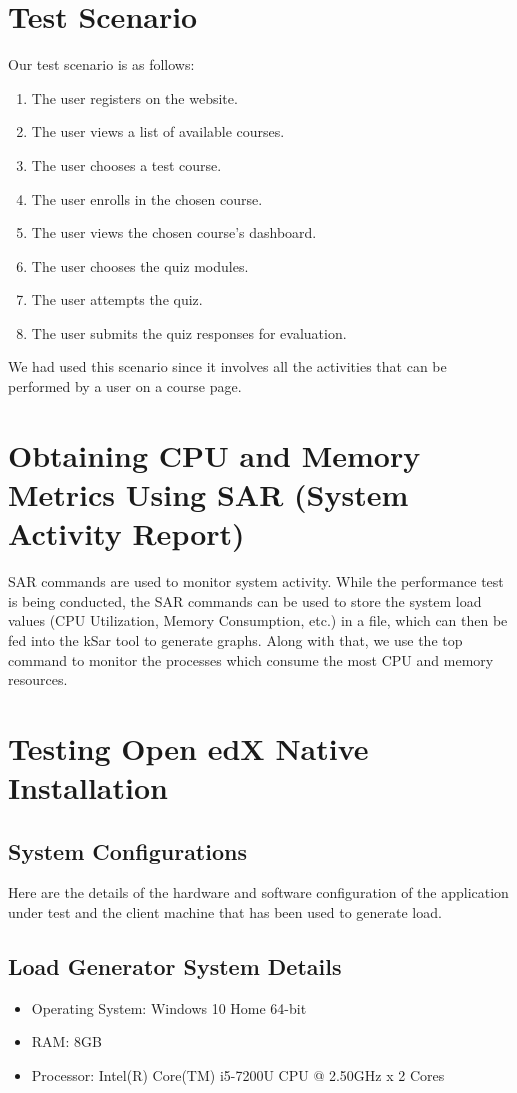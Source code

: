\documentclass[12pt]{report}
\begin{document}
\section{Test Scenario}
Our test scenario is as follows:
\begin{enumerate}
	\item The user registers on the website.
	\item The user views a list of available courses.
	\item The user chooses a test course.
	\item The user enrolls in the chosen course.
	\item The user views the chosen course's dashboard.
	\item The user chooses the quiz modules.
	\item The user attempts the quiz.
	\item The user submits the quiz responses for evaluation.
\end{enumerate}
We had used this scenario since it involves all the activities that can be performed by a user on a course page.
\par
\section{Obtaining CPU and Memory Metrics Using SAR (System Activity Report)}
SAR commands are used to monitor system activity. While the performance test is being conducted, the SAR commands can be used to store the system load values (CPU Utilization, Memory Consumption, etc.) in a file, which can then be fed into the kSar tool to generate graphs. Along with that, we use the top command to monitor the processes which consume the most CPU and memory resources.
\section{Testing Open edX Native Installation}
\subsection{System Configurations}
Here are the details of the hardware and software configuration of the application under test and the client machine that has been used to generate load.
\subsection{Load Generator System Details}
\begin{itemize}
	\item Operating System: Windows 10 Home 64-bit
	\item RAM: 8GB
	\item Processor: Intel(R) Core(TM) i5-7200U CPU @ 2.50GHz x 2 Cores
\end{itemize}
\end{document}
